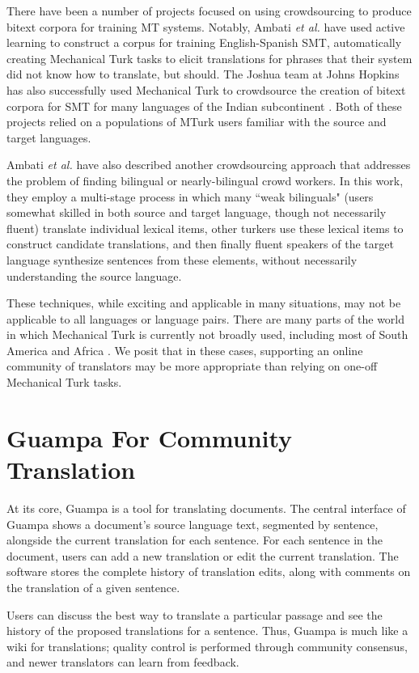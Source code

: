 \documentclass[10pt, a4paper]{article}
\begin{document}
There have been a number of projects focused on using crowdsourcing to produce
bitext corpora for training MT systems. Notably, Ambati \emph{et al.}
\cite{ambati_naacl,ambati_act} have used active learning to construct a corpus
for training English-Spanish SMT, automatically creating Mechanical Turk tasks
to elicit translations for phrases that their system did not know how to
translate, but should. The Joshua team at Johns Hopkins has also successfully
used Mechanical Turk to crowdsource the creation of bitext corpora for SMT for
many languages of the Indian subcontinent
\cite{post-callisonburch-osborne:2012:WMT}. Both of these projects relied on a
populations of MTurk users familiar with the source and target languages.

Ambati \emph{et al.} \cite{Ambati:2012:CWC:2145204.2145382} have also described
another crowdsourcing approach that addresses the problem of finding bilingual
or nearly-bilingual crowd workers. In this work, they employ a multi-stage
process in which many ``weak bilinguals" (users somewhat skilled in both source
and target language, though not necessarily fluent) translate individual
lexical items, other turkers use these lexical items to construct candidate
translations, and then finally fluent speakers of the target language
synthesize sentences from these elements, without necessarily understanding the
source language.

These techniques, while exciting and applicable in many situations, may not be
applicable to all languages or language pairs. There are many parts of the
world in which Mechanical Turk is currently not broadly used, including most of
South America and Africa \cite{Pavlick-EtAl-2014:TACL}.  We posit that in these
cases, supporting an online community of translators may be more appropriate
than relying on one-off Mechanical Turk tasks.

\section{Guampa For Community Translation}
At its core, Guampa is a tool for translating documents. The central interface
of Guampa shows a document's source language text, segmented by sentence,
alongside the current translation for each sentence. For each sentence in the
document, users can add a new translation or edit the current translation. The
software stores the complete history of translation edits, along with comments
on the translation of a given sentence.

Users can discuss the best way to translate a particular passage and see the
history of the proposed translations for a sentence. Thus, Guampa is much like
a wiki for translations; quality control is performed through community
consensus, and newer translators can learn from feedback.
\end{document}
